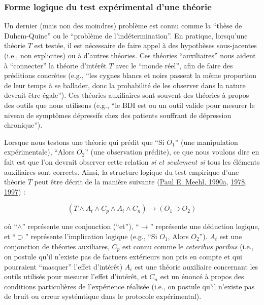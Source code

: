 \documentclass[
  a4paper,11pt,twoside,onecolumn,openright,final,oldfontcommands]{memoir}
\theoremstyle{definition}
\theoremstyle{definition}
\theoremstyle{definition}
\theoremstyle{definition}
\theoremstyle{remark}
\begin{document}
\hypertarget{forme-logique-du-test-expuxe9rimental-dune-thuxe9orie}{%
\subsubsection{Forme logique du test expérimental d'une théorie}\label{forme-logique-du-test-expuxe9rimental-dune-thuxe9orie}}

Un dernier (mais non des moindres) problème est connu comme la ``thèse de Duhem-Quine'' ou le ``problème de l'indétermination''. En pratique, lorsqu'une théorie \(T\) est testée, il est nécessaire de faire appel à des hypothèses sous-jacentes (i.e., non explicites) ou à d'autres théories. Ces théories ``auxiliaires'' nous aident à ``connecter'' la théorie d'intérêt \(T\) avec le ``monde réel'', afin de faire des préditions concrètes (e.g., ``les cygnes blancs et noirs passent la même proportion de leur temps à se ballader, donc la probabilité de les observer dans la nature devrait être égale''). Ces théories auxiliaires sont souvent des théories à propos des outils que nous utilisons (e.g., ``le BDI est ou un outil valide pour mesurer le niveau de symptômes dépressifs chez des patients souffrant de dépression chronique'').

Lorsque nous testons une théorie qui prédit que ``Si \(O_{1}\)'' (une manipulation expérimentale), ``Alors \(O_{2}\)'' (une observation prédite), ce que nous voulons dire en fait est que l'on devrait observer cette relation \emph{si et seulement si} tous les éléments auxiliaires sont corrects. Ainsi, la structure logique du test empirique d'une théorie \(T\) peut être décrit de la manière suivante (\protect\hyperlink{ref-meehl_appraising_1990}{Paul E. Meehl, 1990a}, \protect\hyperlink{ref-meehl_theoretical_1978}{1978}, \protect\hyperlink{ref-harlow_problem_1997}{1997}) :

\[(T \land A_{t} \land C_{p} \land A_{i} \land C_{n}) \to (O_{1} \supset O_{2})\]

où ``\(\land\)'' représente une conjonction (``et''), ``\(\to\)'' représente une déduction logique, et ``\(\supset\)'' représente l'implication logique (e.g., ``Si \(O_{1}\), Alors \(O_{2}\)''). \(A_{t}\) est une conjonction de théories auxiliares, \(C_{p}\) est connu comme le \emph{ceteribus paribus} (i.e., on postule qu'il n'existe pas de factuers extérieurs non pris en compte et qui pourraient ``masquer'' l'effet d'intérêt) \(A_{i}\) est une théorie auxiliaire concernant les outils utilisés pour mesurer l'effet d'intérêt, et \(C_{n}\) est un énoncé à propos des conditions particulières de l'expérience réalisée (i.e., on postule qu'il n'existe pas de bruit ou erreur systémtique dans le protocole expérimental).
\end{document}
